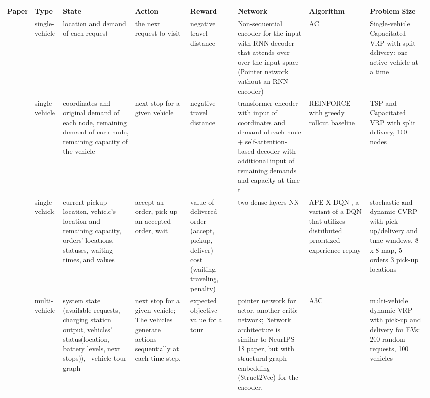 \documentclass{article}
\begin{document}
\begin{table}
\scriptsize
\begin{tabular}{||p{}|p{}|p{}|p{}|p{}|p{}|p{}|p{}||} 
\hline
Paper & Type & State & Action & Reward & Network & Algorithm & Problem Size \\
\hline\hline
\cite{nazari2018reinforcement} & single-vehicle & location and demand of each request & the next request to visit & negative travel distance & Non-sequential encoder for the input with RNN decoder that attends over over the input space (Pointer network without an RNN encoder) & AC & Single-vehicle Capacitated VRP with split delivery: one active vehicle at a time \\
\hline
\cite{kool2018attention} & single-vehicle & coordinates and original demand of each node, remaining demand of each node, remaining capacity of the vehicle & next stop for a given vehicle & negative travel distance & transformer encoder with input of coordinates and demand of each node + self-attention-based decoder with additional input of remaining demands and capacity at time t & REINFORCE with greedy rollout baseline & TSP and Capacitated VRP with split delivery, 100 nodes \\
\hline
\cite{balaji2019orl} & single-vehicle  & current pickup location, vehicle's location and remaining capacity, orders' locations, statuses, waiting times, and values & accept an order, pick up an accepted order, wait & value of delivered order (accept, pickup, deliver) - cost (waiting, traveling, penalty) & two dense layers NN & APE-X DQN \citep{horgan2018distributed}, a variant of a DQN that utilizes distributed prioritized experience replay  & stochastic and dynamic CVRP with pick-up/delivery and time windows, 8 x 8 map, 5 orders 3 pick-up locations \\
\hline
\cite{james2019online} & multi-vehicle & system state (available requests, charging station output, vehicles' status(location, battery levels, next stops)),  vehicle tour graph & next stop for a given vehicle; The vehicles generate actions sequentially at each time step. & expected objective value for a tour & pointer network for actor, another critic network; 
Network architecture is similar to NeurIPS-18 paper, but with structural graph embedding (Struct2Vec) for the encoder. & A3C & multi-vehicle dynamic VRP with pick-up and delivery for EVs: 200 random requests, 100 vehicles \\
\hline

\end{tabular}
\end{table}
\end{document}
